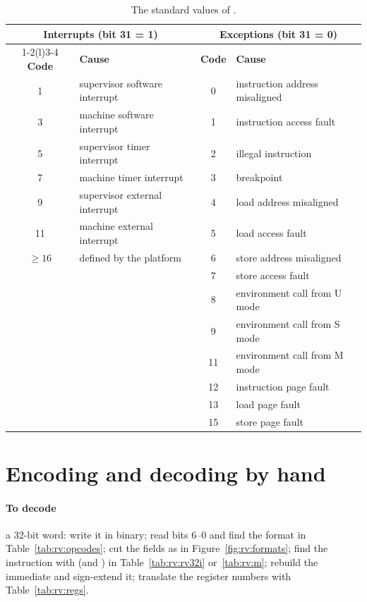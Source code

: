 \begin{table}[htb]
\centering\small
\caption{The standard values of .}\label{tab:rv:mcause}
\begin{tabular}{@{}clcl@{}}
\toprule
\multicolumn{2}{c}{\textbf{Interrupts} (bit 31 = 1)} & \multicolumn{2}{c}{\textbf{Exceptions} (bit 31 = 0)}\\
\cmidrule(r){1-2}\cmidrule(l){3-4}
\textbf{Code} & \textbf{Cause} & \textbf{Code} & \textbf{Cause}\\
\midrule
1 & supervisor software interrupt & 0 & instruction address misaligned\\
3 & machine software interrupt & 1 & instruction access fault\\
5 & supervisor timer interrupt & 2 & illegal instruction\\
7 & machine timer interrupt & 3 & breakpoint\\
9 & supervisor external interrupt & 4 & load address misaligned\\
11 & machine external interrupt & 5 & load access fault\\
$\ge 16$ & defined by the platform & 6 & store address misaligned\\
 & & 7 & store access fault\\
 & & 8 & environment call from U mode\\
 & & 9 & environment call from S mode\\
 & & 11 & environment call from M mode\\
 & & 12 & instruction page fault\\
 & & 13 & load page fault\\
 & & 15 & store page fault\\
\bottomrule
\end{tabular}
\end{table}

\section{Encoding and decoding by hand}

\paragraph{To decode} a 32-bit word: write it in binary; read bits 6--0 and
find the format in Table~\ref{tab:rv:opcodes}; cut the fields as in
Figure~\ref{fig:rv:formats}; find the instruction with  (and
) in Table~\ref{tab:rv:rv32i} or~\ref{tab:rv:m}; rebuild the
immediate and sign-extend it; translate the register numbers with
Table~\ref{tab:rv:regs}.

